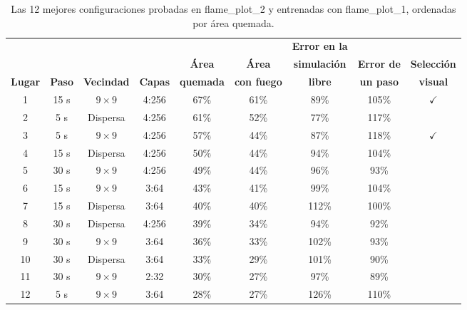 	\begin{table}[htbp]
		\centering
		\footnotesize
		\setlength{\tabcolsep}{3pt}
		\begin{tabular}{@{}ccccccccc@{}}
			\toprule
			& & & & & & \textbf{Error en la} & & \\
			& & & & \textbf{Área} & \textbf{Área} & \textbf{simulación} & \textbf{Error de} & \textbf{Selección} \\
			\textbf{Lugar} & \textbf{Paso} & \textbf{Vecindad} & \textbf{Capas} & \textbf{quemada} & \textbf{con fuego} & \textbf{libre} & \textbf{un paso} & \textbf{visual} \\ \midrule
			1 & 15 s & $9 \times 9$ & 4:256 & 67\% & 61\% & 89\% & 105\% & $\checkmark$ \\
			2 & 5 s & Dispersa & 4:256 & 61\% & 52\% & 77\% & 117\% &  \\
			3 & 5 s & $9 \times 9$ & 4:256 & 57\% & 44\% & 87\% & 118\% & $\checkmark$ \\
			4 & 15 s & Dispersa & 4:256 & 50\% & 44\% & 94\% & 104\% &  \\
			5 & 30 s & $9 \times 9$ & 4:256 & 49\% & 44\% & 96\% & 93\% &  \\
			6 & 15 s & $9 \times 9$ & 3:64 & 43\% & 41\% & 99\% & 104\% &  \\
			7 & 15 s & Dispersa & 3:64 & 40\% & 40\% & 112\% & 100\% &  \\
			8 & 30 s & Dispersa & 4:256 & 39\% & 34\% & 94\% & 92\% &  \\
			9 & 30 s & $9 \times 9$ & 3:64 & 36\% & 33\% & 102\% & 93\% &  \\
			10 & 30 s & Dispersa & 3:64 & 33\% & 29\% & 101\% & 90\% &  \\
			11 & 30 s & $9 \times 9$ & 2:32 & 30\% & 27\% & 97\% & 89\% &  \\
			12 & 5 s & $9 \times 9$ & 3:64 & 28\% & 27\% & 126\% & 110\% &  \\
			\bottomrule
		\end{tabular}
		\caption{Las 12 mejores configuraciones probadas en flame\_plot\_2 y entrenadas con flame\_plot\_1, ordenadas por área quemada.}
		\label{tab:flame_18_prueba2}
	\end{table}

